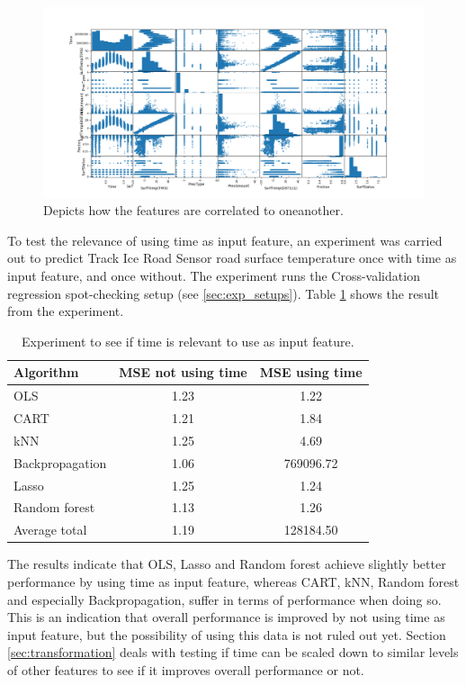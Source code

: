 \begin{figure}[H] 
	\centering
	\includegraphics[width=1\textwidth]{media/relationship_parameters_pre_noerr.png}
	\caption{Depicts how the features are correlated to oneanother.}
	\label{img:correlations_noerr}
\end{figure}

	To test the relevance of using time as input feature, an experiment was carried out to predict Track Ice Road Sensor road surface temperature once with time as input feature, and once without. The experiment runs the Cross-validation regression spot-checking setup (see \ref{sec:exp_setups}). Table \ref{table:timeinput} shows the result from the experiment.

	\begin{table}[H] %
	\centering
	\caption{Experiment to see if time is relevant to use as input feature. }
		\begin{tabular}[3]{l | c | c}
    			Algorithm & MSE not using time & MSE using time \\
    			\hline
			OLS & 1.23 & 1.22 \\
			CART & 1.21 & 1.84 \\
			kNN & 1.25 & 4.69 \\
			Backpropagation & 1.06 & 769096.72 \\
			Lasso & 1.25 & 1.24 \\
			Random forest & 1.13 & 1.26 \\
			\hline
			Average total & 1.19 & 128184.50
			\label{table:timeinput}
		\end{tabular}
	\end{table}

	The results indicate that OLS, Lasso and Random forest achieve slightly better performance by using time as input feature, whereas CART, kNN, Random forest and especially Backpropagation, suffer in terms of performance when doing so. This is an indication that overall performance is improved by not using time as input feature, but the possibility of using this data is not ruled out yet. Section \ref{sec:transformation} deals with testing if time can be scaled down to similar levels of other features to see if it improves overall performance or not.

